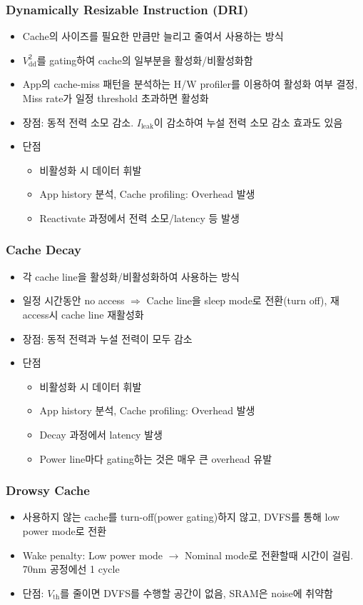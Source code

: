 \subsubsection*{Dynamically Resizable Instruction (DRI)}
\begin{itemize}
    \item Cache의 사이즈를 필요한 만큼만 늘리고 줄여서 사용하는 방식
    \item $V_{\mathrm{dd}}^2$를 gating하여 cache의 일부분을 활성화/비활성화함
    \item App의 cache-miss 패턴을 분석하는 H/W profiler를 이용하여 활성화 여부 결정, Miss rate가 일정 threshold 초과하면 활성화
    \item 장점: 동적 전력 소모 감소. $I_{\mathrm{leak}}$이 감소하여 누설 전력 소모 감소 효과도 있음
    \item 단점
    \begin{itemize}
        \item 비활성화 시 데이터 휘발
        \item App history 분석, Cache profiling: Overhead 발생
        \item Reactivate 과정에서 전력 소모/latency 등 발생
    \end{itemize}
\end{itemize}

\subsubsection*{Cache Decay}
\begin{itemize}
    \item 각 cache line을 활성화/비활성화하여 사용하는 방식
    \item 일정 시간동안 no access $\Rightarrow$ Cache line을 sleep mode로 전환(turn off), 재access시 cache line 재활성화
    \item 장점: 동적 전력과 누설 전력이 모두 감소
    \item 단점
    \begin{itemize}
        \item 비활성화 시 데이터 휘발
        \item App history 분석, Cache profiling: Overhead 발생
        \item Decay 과정에서 latency 발생
        \item Power line마다 gating하는 것은 매우 큰 overhead 유발
    \end{itemize}
\end{itemize}

\subsubsection*{Drowsy Cache}
\begin{itemize}
    \item 사용하지 않는 cache를 turn-off(power gating)하지 않고, DVFS를 통해 low power mode로 전환
    \item Wake penalty: Low power mode $\rightarrow$ Nominal mode로 전환할때 시간이 걸림. 70nm 공정에선 1 cycle
    \item 단점: $V_{\mathrm{th}}$를 줄이면 DVFS를 수행할 공간이 없음, SRAM은 noise에 취약함
\end{itemize}


